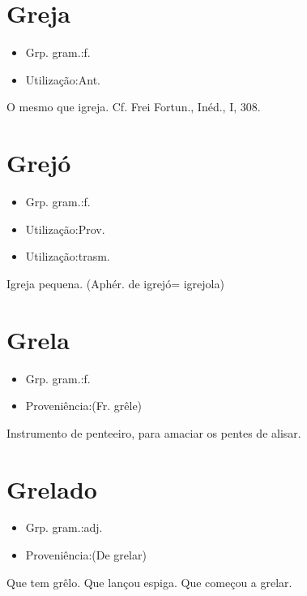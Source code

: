 \section{Greja}
\begin{itemize}
\item {Grp. gram.:f.}
\end{itemize}
\begin{itemize}
\item {Utilização:Ant.}
\end{itemize}
O mesmo que \textunderscore igreja\textunderscore . Cf. Frei Fortun., \textunderscore Inéd.\textunderscore , I, 308.
\section{Grejó}
\begin{itemize}
\item {Grp. gram.:f.}
\end{itemize}
\begin{itemize}
\item {Utilização:Prov.}
\end{itemize}
\begin{itemize}
\item {Utilização:trasm.}
\end{itemize}
Igreja pequena.
(Aphér. de \textunderscore igrejó\textunderscore  = \textunderscore igrejola\textunderscore )
\section{Grela}
\begin{itemize}
\item {Grp. gram.:f.}
\end{itemize}
\begin{itemize}
\item {Proveniência:(Fr. \textunderscore grêle\textunderscore )}
\end{itemize}
Instrumento de penteeiro, para amaciar os pentes de alisar.
\section{Grelado}
\begin{itemize}
\item {Grp. gram.:adj.}
\end{itemize}
\begin{itemize}
\item {Proveniência:(De \textunderscore grelar\textunderscore )}
\end{itemize}
Que tem grêlo.
Que lançou espiga.
Que começou a grelar.
